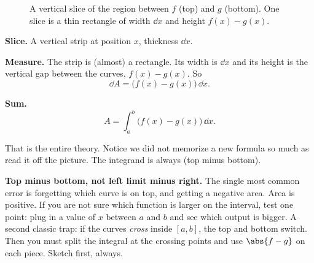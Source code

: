 \begin{figure}[H]
\centering
{}
\caption{A vertical slice of the region between $f$ (top) and $g$ (bottom). One
slice is a thin rectangle of width $\dd x$ and height $f(x)-g(x)$.}
\label{ch26:fig-area}
\end{figure}

\textbf{Slice.} A vertical strip at position $x$, thickness $\dd x$.

\textbf{Measure.} The strip is (almost) a rectangle. Its width is $\dd x$ and its
height is the vertical gap between the curves, $f(x)-g(x)$. So
\[
  \dd A = \bigl(f(x)-g(x)\bigr)\,\dd x.
\]

\textbf{Sum.}
\[
  \boxed{\,A = \int_a^b \bigl(f(x)-g(x)\bigr)\,\dd x.\,}
\]

That is the entire theory. Notice we did not memorize a new formula so much as
read it off the picture. The integrand is always (top minus bottom).

\begin{trapbox}
\textbf{Top minus bottom, not left limit minus right.} The single most common
error is forgetting which curve is on top, and getting a negative area. Area is
positive. If you are not sure which function is larger on the interval, test one
point: plug in a value of $x$ between $a$ and $b$ and see which output is bigger.
A second classic trap: if the curves \emph{cross} inside $[a,b]$, the top and
bottom switch. Then you must split the integral at the crossing points and use
$\abs{f-g}$ on each piece. Sketch first, always.
\end{trapbox}

